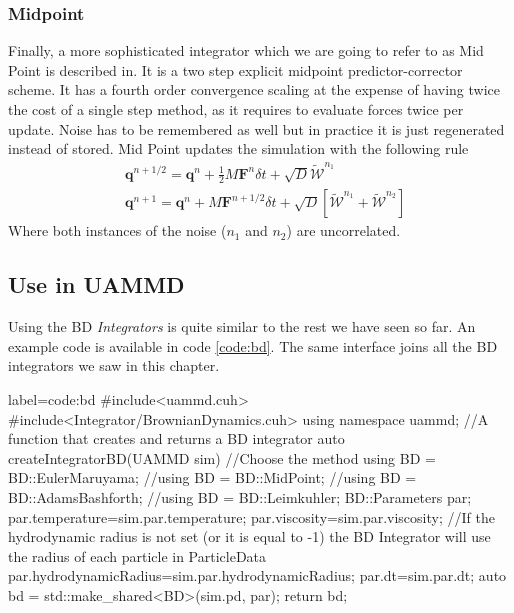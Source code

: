 \documentclass[ twoside,openright,titlepage,numbers=noenddot,%
headinclude,footinclude,cleardoublepage=empty,abstract=on,
BCOR=5mm,paper=a4,fontsize=11pt, dvipsnames
]{scrreprt}
\renewcommand{\vec}[1]{\bm{#1}}
\newcommand{\dt}{\delta t}
\newcommand{\half}{\frac{1}{2}}
\newcommand{\noise}{\widetilde{W}}
\newcommand{\ppos}{q}
\begin{document}
\subsubsection*{Midpoint}
Finally, a more sophisticated integrator which we are going to refer to as Mid Point is described in\cite{Delong2013}. 
It is a two step explicit midpoint predictor-corrector scheme. It has a fourth order convergence scaling at the expense of having twice the cost of a single step method, as it requires to evaluate forces twice per update. Noise has to be remembered as well but in practice it is just regenerated instead of stored.
Mid Point updates the simulation with the following rule
\begin{equation}
  \begin{aligned}
    &\vec{\ppos}^{n+1/2} = \vec{\ppos}^n + \half M\vec{F}^n\dt + \sqrt{D}\vec{\mathcal{\noise}}^{n_1}\\
    &\vec{\ppos}^{n+1} = \vec{\ppos}^n + M\vec{F}^{n+1/2}\dt + \sqrt{D}\left[\vec{\mathcal{\noise}}^{n_1}  + \vec{\mathcal{\noise}}^{n_2}\right]
  \end{aligned}
\end{equation}
Where both instances of the noise ($n_1$ and $n_2$) are uncorrelated.
\subsection*{Use in UAMMD}
Using the \gls{BD} \emph{Integrators} is quite similar to the rest we have seen so far. An example code is available in code \ref{code:bd}. The same interface joins all the \gls{BD} integrators we saw in this chapter.
\begin{code2}{label=code:bd}
#include<uammd.cuh>
#include<Integrator/BrownianDynamics.cuh>
using namespace uammd;
//A function that creates and returns a BD integrator
auto createIntegratorBD(UAMMD sim){   
  //Choose the method
  using BD = BD::EulerMaruyama;
  //using BD = BD::MidPoint;
  //using BD = BD::AdamsBashforth;
  //using BD = BD::Leimkuhler;
  BD::Parameters par;
  par.temperature=sim.par.temperature;
  par.viscosity=sim.par.viscosity;
  //If the hydrodynamic radius is not set (or it is equal to -1) the BD Integrator will use the radius of each particle in ParticleData
  par.hydrodynamicRadius=sim.par.hydrodynamicRadius;
  par.dt=sim.par.dt;
  auto bd = std::make_shared<BD>(sim.pd, par);
  return bd;
}
\end{code2}
\end{document}
